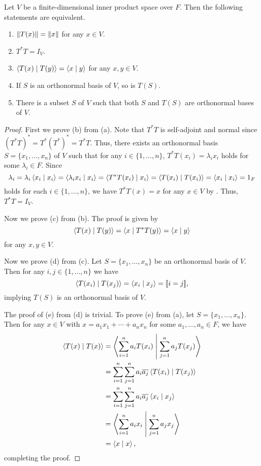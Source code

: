 \begin{theorem}
  \label{thm:unitary-equivalence}
  Let $V$ be a finite-dimensional inner product space over $F$.
  Then the following statements are equivalent.
  \begin{enumerate}
    \item $\left\Vert T(x) \right\Vert = \left\Vert x \right\Vert$ for any $x \in V$.
    \item $T^*T = I_V$.
    \item $\left\langle T(x) \; \middle| \; T(y) \right\rangle = \left\langle x \; \middle| \; y \right\rangle$ for any $x, y \in V$.
    \item If $S$ is an orthonormal basis of $V$, so is $T(S)$.
    \item There is a subset $S$ of $V$ such that both $S$ and $T(S)$ are
    orthonormal bases of $V$.
  \end{enumerate}
\end{theorem}
\begin{proof}
  First we prove (b) from (a).
  Note that $T^*T$ is self-adjoint and normal since
  $(T^*T)^* = T^*(T^*)^* = T^*T$.
  Thus, there exists an orthonormal basis $S = \{x_1, \dots, x_n\}$ of $V$ such
  that for any $i \in \{1, \dots, n\}$, $T^*T(x_i) = \lambda_ix_i$ holds for
  some $\lambda_i \in F$.
  Since
  \begin{equation*}
    \lambda_i
    = \lambda_i\left\langle x_i \; \middle| \; x_i \right\rangle
    = \left\langle \lambda_ix_i \; \middle| \; x_i \right\rangle
    = \left\langle T^*T(x_i) \; \middle| \; x_i \right\rangle
    = \left\langle T(x_i) \; \middle| \; T(x_i) \right\rangle
    = \left\langle x_i \; \middle| \; x_i \right\rangle
    = 1_F
  \end{equation*}
  holds for each $i \in \{1, \dots, n\}$, we have $T^*T(x) = x$ for any
  $x \in V$ by .
  Thus, $T^*T = I_V$.

  Now we prove (c) from (b).
  The proof is given by
  \begin{equation*}
    \left\langle T(x) \; \middle| \; T(y) \right\rangle
    = \left\langle x \; \middle| \; T^*T(y) \right\rangle
    = \left\langle x \; \middle| \; y \right\rangle
  \end{equation*}
  for any $x, y \in V$.

  Now we prove (d) from (c).
  Let $S = \{x_1, \dots, x_n\}$ be an orthonormal basis of $V$.
  Then for any $i, j \in \{1, \dots, n\}$ we have
  \begin{equation*}
    \left\langle T(x_i) \; \middle| \; T(x_j) \right\rangle
    = \left\langle x_i \; \middle| \; x_j \right\rangle
    = [\![i = j]\!],
  \end{equation*}
  implying $T(S)$ is an orthonormal basis of $V$.

  The proof of (e) from (d) is trivial.
  To prove (e) from (a), let $S = \{x_1, \dots, x_n\}$.
  Then for any $x \in V$ with $x = a_1x_1 + \cdots + a_nx_n$ for some
  $a_1, \dots, a_n \in F$, we have
  \begin{align*}
    \left\langle T(x) \; \middle| \; T(x) \right\rangle
    &= \left\langle \sum_{i=1}^n a_iT(x_i) \; \middle| \; \sum_{j=1}^n a_jT(x_j) \right\rangle \\
    &= \sum_{i=1}^n \sum_{j=1}^n a_i\overline{a_j}\left\langle T(x_i) \; \middle| \; T(x_j) \right\rangle \\
    &= \sum_{i=1}^n \sum_{j=1}^n a_i\overline{a_j}\left\langle x_i \; \middle| \; x_j \right\rangle \\
    &= \left\langle \sum_{i=1}^n a_ix_i \; \middle| \; \sum_{j=1}^n a_jx_j \right\rangle \\
    &= \left\langle x \; \middle| \; x \right\rangle,
  \end{align*}
  completing the proof.
\end{proof}

